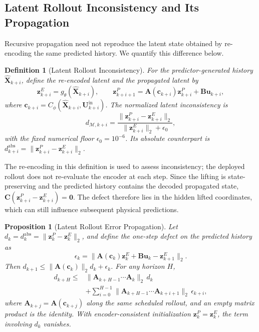 \documentclass[journal]{IEEEtran}
\newtheorem{definition}{Definition}
\newtheorem{proposition}{Proposition}
\newcommand{\vu}{\mathbf{u}}
\newcommand{\vz}{\mathbf{z}}
\newcommand{\mA}{\mathbf{A}}
\newcommand{\mB}{\mathbf{B}}
\newcommand{\mC}{\mathbf{C}}
\newcommand{\mX}{\mathbf{X}}
\newcommand{\mU}{\mathbf{U}}
\newcommand{\vc}{\mathbf{c}}
\begin{document}
\subsection{Latent Rollout Inconsistency and Its Propagation}
\label{subsec:rollout}

Recursive propagation need not reproduce the latent state obtained by re-encoding the same predicted history. We quantify this difference below.

\begin{definition}[Latent Rollout Inconsistency]
\label{def:rollout}
For the predictor-generated history \(\hat{\mX}_{k+i}\), define the re-encoded latent and the propagated latent by
\begin{equation}
    \vz^{E}_{k+i} = g_\theta(\hat{\mX}_{k+i}), \qquad
    \vz^{P}_{k+i+1} = \mA(\vc_{k+i})\vz^{P}_{k+i} + \mB\vu_{k+i},
\end{equation}
where \(\vc_{k+i}=C_\phi(\hat{\mX}_{k+i},\mU^{\mathrm{in}}_{k+i})\). The normalized latent inconsistency is
\begin{equation}
    d_{\mathcal{M},k+i} = \frac{\big\|\vz^{P}_{k+i}-\vz^{E}_{k+i}\big\|_2}{\big\|\vz^{E}_{k+i}\big\|_2+\epsilon_0},
    \label{eq:defect}
\end{equation}
with the fixed numerical floor \(\epsilon_0=10^{-6}\). Its absolute counterpart is \(d^{\mathrm{abs}}_{k+i}=\|\vz^{P}_{k+i}-\vz^{E}_{k+i}\|_2\).
\end{definition}

The re-encoding in this definition is used to assess inconsistency; the deployed rollout does not re-evaluate the encoder at each step. Since the lifting is state-preserving and the predicted history contains the decoded propagated state,
\(\mC(\vz^{P}_{k+i}-\vz^{E}_{k+i})=\mathbf{0}\).
The defect therefore lies in the hidden lifted coordinates, which can still influence subsequent physical predictions.

\begin{proposition}[Latent Rollout Error Propagation]
\label{prop:propagation}
Let \(d_k=d^{\mathrm{abs}}_k=\|\vz^{P}_k-\vz^{E}_k\|_2\), and define the one-step defect on the predicted history as
\begin{equation}
    \epsilon_k = \big\|\mA(\vc_k)\vz^{E}_k + \mB\vu_k - \vz^{E}_{k+1}\big\|_2 .
\end{equation}
Then \(d_{k+1}\le\|\mA(\vc_k)\|_2d_k+\epsilon_k\). For any horizon \(H\),
\begin{equation}
    \begin{aligned}
    d_{k+H}\le{}&
    \big\|\mA_{k+H-1}\cdots\mA_{k}\big\|_2\,d_k \\
    &+\sum_{i=0}^{H-1}\big\|\mA_{k+H-1}\cdots\mA_{k+i+1}\big\|_2\,\epsilon_{k+i},
    \end{aligned}
    \label{eq:prop_bound}
\end{equation}
where \(\mA_{k+j}=\mA(\vc_{k+j})\) along the same scheduled rollout, and an empty matrix product is the identity. With encoder-consistent initialization \(\vz_k^P=\vz_k^E\), the term involving \(d_k\) vanishes.
\end{proposition}
\end{document}
